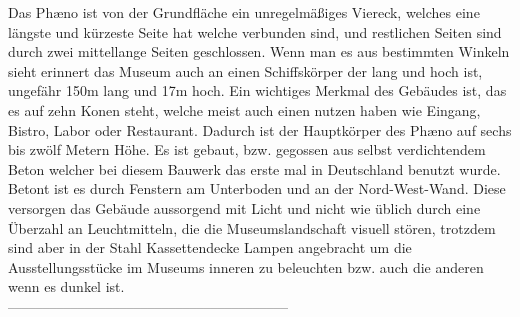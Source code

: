 \documentclass[a4paper, 12p]{article}
\begin{document}
Das Phæno ist von der Grundfläche ein unregelmäßiges Viereck, welches eine
längste und kürzeste Seite hat welche verbunden sind, und restlichen Seiten sind durch zwei
mittellange Seiten geschlossen. Wenn man es aus bestimmten Winkeln sieht
erinnert das Museum auch an einen Schiffskörper der lang und hoch ist, ungefähr
150m lang und 17m hoch. Ein wichtiges Merkmal des Gebäudes ist, das es
auf zehn Konen steht, welche meist auch einen nutzen haben wie Eingang, Bistro,
Labor oder Restaurant. Dadurch ist der Hauptkörper des Phæno auf sechs bis zwölf 
Metern Höhe. Es ist gebaut, bzw. gegossen aus selbst verdichtendem Beton welcher bei diesem
Bauwerk das erste mal in Deutschland benutzt wurde. Betont ist es durch
Fenstern am Unterboden und an der Nord-West-Wand. Diese versorgen das Gebäude
aussorgend mit Licht und nicht wie üblich durch eine Überzahl an Leuchtmitteln,
die die Museumslandschaft visuell stören, trotzdem sind aber in der Stahl
Kassettendecke Lampen angebracht um die Ausstellungsstücke im Museums inneren zu
beleuchten bzw. auch die anderen wenn es dunkel ist.
\\––––––––––––––––––––––––––––––––––––––––\\
%
%
\end{document}
